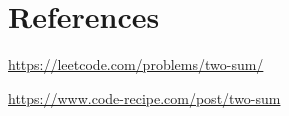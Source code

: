 
\section*{References}

    \begin{enumerate}[label={[\arabic*]}, ref=\arabic*]
        \item{\href{https://leetcode.com/problems/two-sum/}{https://leetcode.com/problems/two-sum/}}
        \item{\href{https://www.code-recipe.com/post/two-sum}{https://www.code-recipe.com/post/two-sum}}
    \end{enumerate}
